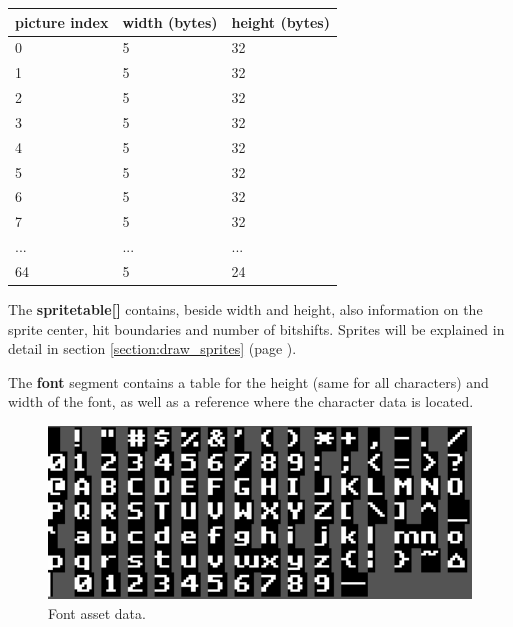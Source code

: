 \documentclass[book.tex]{subfiles}
\begin{document}
  \begin{table}[H]
  \begin{tabularx}{0.8\textwidth}[c]{XXX}
  \hline
  \textbf{picture index} & \textbf{width (bytes)} & \textbf{height (bytes)}   \\ \hline
  0             & 5          & 32    \\
  1             & 5          & 32    \\
  2             & 5          & 32    \\
  3             & 5          & 32    \\
  4             & 5          & 32    \\
  5             & 5          & 32    \\
  6             & 5          & 32    \\
  7             & 5          & 32    \\
  ...             & ...          & ...    \\
  64             & 5          & 24    \\
  \end{tabularx}
  \end{table}



The \textbf{spritetable[]} contains, beside width and height, also information on the sprite center, hit boundaries and number of bitshifts. Sprites will be explained in detail in section \ref{section:draw_sprites} (page \pageref{section:draw_sprites}). \\
\par


The \textbf{font} segment contains a table for the height (same for all characters) and width of the font, as well as a reference where the character data is located.\\
\par
\begin{minipage}{\textwidth}
 \par
 \end{minipage}
\begin{figure}[H] 
  \centering 
  \includegraphics[width=1.0\textwidth, frame]{screenshots_300dpi/font.png}
  \caption{Font asset data.}
  \label{fig:font_assets}
\end{figure} 
\end{document}
